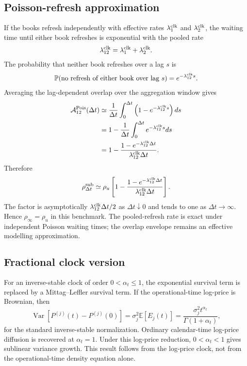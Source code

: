 \documentclass[5p,final]{elsarticle}
\begin{document}
\subsection{Poisson-refresh approximation}

If the books refresh independently with effective rates $\lambda_1^{\rm clk}$ and $\lambda_2^{\rm clk}$, the waiting time until either book refreshes is exponential with the pooled rate
\begin{equation}
    \lambda_{12}^{\rm clk}=\lambda_1^{\rm clk}+\lambda_2^{\rm clk}.
\end{equation}
The probability that neither book refreshes over a lag $s$ is
\begin{equation}
    \mathbb P(\text{no refresh of either book over lag }s)
    =e^{-\lambda_{12}^{\rm clk}s}.
\end{equation}
Averaging the lag-dependent overlap over the aggregation window gives
\begin{align}
    \mathcal A_{12}^{\rm Pois}(\Delta t)
    &\simeq
    \frac{1}{\Delta t}\int_0^{\Delta t}
    \left(1-e^{-\lambda_{12}^{\rm clk}s}\right)ds\\
    &=1-\frac{1}{\Delta t}\int_0^{\Delta t}
    e^{-\lambda_{12}^{\rm clk}s}ds\\
    &=1-\frac{1-e^{-\lambda_{12}^{\rm clk}\Delta t}}
    {\lambda_{12}^{\rm clk}\Delta t}.
\end{align}
Therefore
\begin{equation}
    \rho_{\Delta t}^{\rm sub}
    \simeq
    \rho_u\left[1-\frac{1-e^{-\lambda_{12}^{\rm clk}\Delta t}}
    {\lambda_{12}^{\rm clk}\Delta t}\right].
\end{equation}
The factor is asymptotically $\lambda_{12}^{\rm clk}\Delta t/2$ as $\Delta t\downarrow0$ and tends to one as $\Delta t\to\infty$. Hence $\rho_\infty=\rho_u$ in this benchmark. The pooled-refresh rate is exact under independent Poisson waiting times; the overlap envelope remains an effective modelling approximation.

\subsection{Fractional clock version}

For an inverse-stable clock of order $0<\alpha_t\leq1$, the exponential survival term is replaced by a Mittag--Leffler survival term. If the operational-time log-price is Brownian, then
\begin{equation}
    \operatorname{Var}[P^{(j)}(t)-P^{(j)}(0)]
    =\sigma_j^2\mathbb E[E_j(t)]
    =\frac{\sigma_j^2t^{\alpha_t}}{\Gamma(1+\alpha_t)},
    \label{eq:fractional-price-variance}
\end{equation}
for the standard inverse-stable normalization. Ordinary calendar-time log-price diffusion is recovered at $\alpha_t=1$. Under this log-price reduction, $0<\alpha_t<1$ gives sublinear variance growth. This result follows from the log-price clock, not from the operational-time density equation alone.
\end{document}
